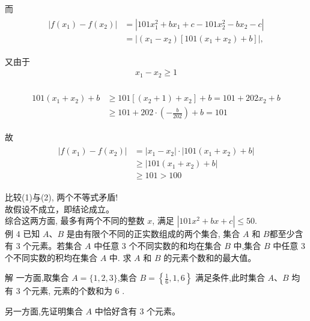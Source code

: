\documentclass[10pt]{article}
\begin{document}
而\\
\begin{align*}
\begin{aligned}
\left|f\left(x_{1}\right)-f\left(x_{2}\right)\right| & =\left|101 x_{1}^{2}+b x_{1}+c-101 x_{2}^{2}-b x_{2}-c\right| \\
& =\left|\left(x_{1}-x_{2}\right)\left[101\left(x_{1}+x_{2}\right)+b\right]\right|,
\end{aligned}
\end{align*}

又由于\\
\begin{align*}
x_{1}-x_{2} \geqslant 1
\end{align*}\\
\begin{align*}
\begin{aligned}
101\left(x_{1}+x_{2}\right)+b & \geqslant 101\left[\left(x_{2}+1\right)+x_{2}\right]+b=101+202 x_{2}+b \\
& \geqslant 101+202 \cdot\left(-\frac{b}{202}\right)+b=101
\end{aligned}
\end{align*}

故\\
\begin{align*}
\begin{aligned}
\left|f\left(x_{1}\right)-f\left(x_{2}\right)\right| & =\left|x_{1}-x_{2}\right| \cdot\left|101\left(x_{1}+x_{2}\right)+b\right| \\
& \geqslant\left|101\left(x_{1}+x_{2}\right)+b\right| \\
& \geqslant 101>100
\end{aligned}
\end{align*}

比较(1)与(2), 两个不等式矛盾!\\
故假设不成立，即结论成立。\\
综合这两方面, 最多有两个不同的整数 $x$, 满足 $\left|101 x^{2}+b x+c\right| \leqslant 50$.\\
例 4 已知 $A 、 B$ 是由有限个不同的正实数组成的两个集合, 集合 $A$ 和 $B$都至少含有 3 个元素。若集合 $A$ 中任意 3 个不同实数的和均在集合 $B$ 中,集合 $B$ 中任意 3 个不同实数的积均在集合 $A$ 中. 求 $A$ 和 $B$ 的元素个数和的最大值。

解 一方面,取集合 $A=\{1,2,3\}$,集合 $B=\left\{\frac{1}{6}, 1,6\right\}$ 满足条件,此时集合 $A 、 B$ 均有 3 个元素, 元素的个数和为 6 .

另一方面,先证明集合 $A$ 中恰好含有 3 个元素。
\end{document}
